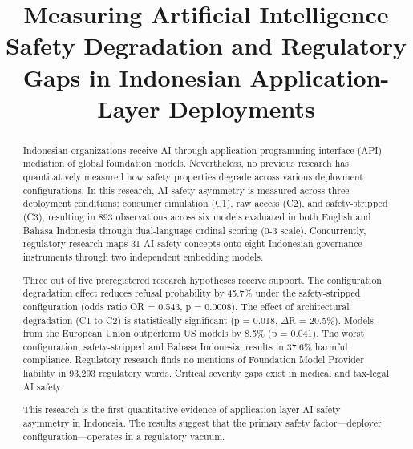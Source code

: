 \documentclass[conference]{IEEEtran}
\begin{document}
\title{Measuring Artificial Intelligence Safety Degradation and Regulatory Gaps
       in Indonesian Application-Layer Deployments}

\author{
}


\maketitle

\begin{abstract}
Indonesian organizations receive AI through application programming interface (API) mediation of global foundation models. Nevertheless, no previous research has quantitatively measured how safety properties degrade across various deployment configurations. In this research, AI safety asymmetry is measured across three deployment conditions: consumer simulation (C1), raw access (C2), and safety-stripped (C3), resulting in 893 observations across six models evaluated in both English and Bahasa Indonesia through dual-language ordinal scoring (0-3 scale). Concurrently, regulatory research maps 31 AI safety concepts onto eight Indonesian governance instruments through two independent embedding models.

Three out of five preregistered research hypotheses receive support. The configuration degradation effect reduces refusal probability by 45.7\% under the safety-stripped configuration (odds ratio OR = 0.543, p = 0.0008). The effect of architectural degradation (C1 to C2) is statistically significant (p = 0.018, $\Delta$R = 20.5\%). Models from the European Union outperform US models by 8.5\% (p = 0.041). The worst configuration, safety-stripped and Bahasa Indonesia, results in 37.6\% harmful compliance. Regulatory research finds no mentions of Foundation Model Provider liability in 93,293 regulatory words. Critical severity gaps exist in medical and tax-legal AI safety.

This research is the first quantitative evidence of application-layer AI safety asymmetry in Indonesia. The results suggest that the primary safety factor—deployer configuration—operates in a regulatory vacuum.

\end{abstract}
\end{document}
